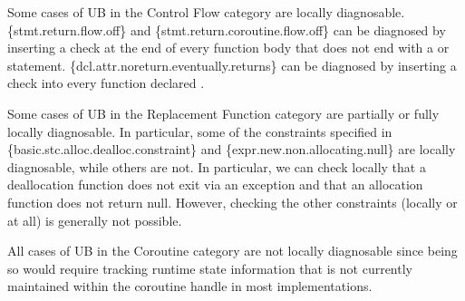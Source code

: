 Some cases of UB in the Control Flow category are locally diagnosable. \{stmt.return.flow.off\} and \{stmt.return.coroutine.flow.off\} can be diagnosed by inserting a check at the end of every function body that does not end with a  or  statement. \{dcl.attr.noreturn.eventually.returns\} can be diagnosed by inserting a check into every function declared \tcode{[[noreturn]]}.

Some cases of UB in the Replacement Function category are partially or fully locally diagnosable. In particular, some of the constraints specified in \{basic.stc.alloc.dealloc.constraint\} and \{expr.new.non.allocating.null\} are locally diagnosable, while others are not. In particular, we can check locally that a deallocation function does not exit via an exception and that an allocation function does not return null. However, checking the other constraints (locally or at all) is generally not possible.

All cases of UB in the Coroutine category are not locally diagnosable since being so would require tracking runtime state information that is not currently maintained within the coroutine handle in most implementations.

